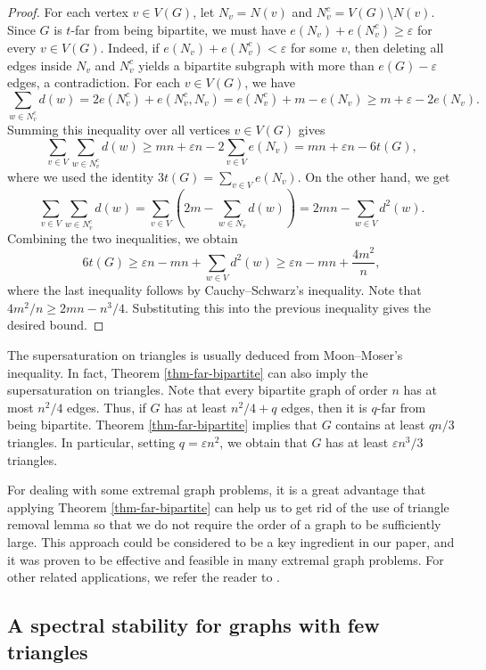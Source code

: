 \documentclass[11pt]{article}
\begin{document}
\begin{proof} 
 For each vertex $v \in V(G)$, let $N_v=N(v)$ 
 and $N_v^c=V(G)\setminus N(v)$.  
Since $G$ is $t$-far from being bipartite, we must have $e(N_v) + e(N_v^c) \ge \varepsilon$ for every $v\in V(G)$. 
Indeed, if $e(N_v) + e(N_v^c) < \varepsilon$ for some $v$, then deleting all edges inside $N_v$ and $N_v^c$ yields a bipartite subgraph with more than $e(G) - \varepsilon$ edges, a contradiction.  
For each $v\in V(G)$, we have 
\[  \sum_{w\in N_v^c} d(w) = 2e(N_v^c) + e(N_v^c,N_v) 
=e(N_v^c) + m - e(N_v) 
\ge m+ \varepsilon -2e(N_v).  
  \]
Summing this inequality over all vertices $v\in V(G)$ gives  
  \[  \sum_{v\in V} \sum_{w\in N_v^c} d(w) 
  \ge mn + \varepsilon n - 2 \sum_{v\in V} e(N_v) = 
  mn + \varepsilon n - 6t(G), \]
  where we used the identity $3t(G) =\sum_{v\in V}e(N_v)$. 
 On the other hand, we get  
\[ \sum_{v\in V} \sum_{w\in N_v^c} d(w)= 
\sum_{v\in V} \left( 2m - \sum_{w\in N_v}d(w) \right) 
= 2mn - \sum_{w\in V} d^2(w). \]
Combining the two inequalities, 
we obtain 
\[  6t(G)  
\ge \varepsilon n - mn + \sum_{w\in V} d^2(w) 
\ge  \varepsilon n - mn + \frac{4m^2}{n}, \]
where the last inequality follows by Cauchy--Schwarz's  inequality. 
Note that  
${4m^2}/{n} \ge 2mn - {n^3}/{4}$. Substituting this into the previous inequality gives the desired bound. 
\end{proof}


The supersaturation on triangles is usually deduced from 
 Moon--Moser's inequality. 
In fact, Theorem \ref{thm-far-bipartite} 
can also imply the supersaturation on triangles.  
Note that every bipartite graph of order $n$ has at most $n^2/4$ edges. 
Thus,  if $G$ has at least ${n^2}/{4} +q$ edges, 
then it is $q$-far from being bipartite. 
 Theorem \ref{thm-far-bipartite} implies that 
$G$ contains at least ${qn}/{3}$ triangles.  
In particular, setting $q=\varepsilon n^2$, 
we obtain that 
$G$ has  at least ${\varepsilon n^3}/{3}$ triangles.  

\medskip 
For dealing with some extremal graph problems, 
it is a great advantage that 
applying Theorem \ref{thm-far-bipartite} can 
help us to get rid of the use of triangle removal lemma so that 
we do not require the order of a graph to be sufficiently large. 
This approach could be considered to be a key ingredient in our paper, and 
it was proven to be effective and feasible in many extremal graph problems. 
For other related applications, 
we refer the reader to \cite{LFP2024-triangular,LFP-count-bowtie}.  


\subsection{A spectral stability for graphs with few triangles}
\end{document}
